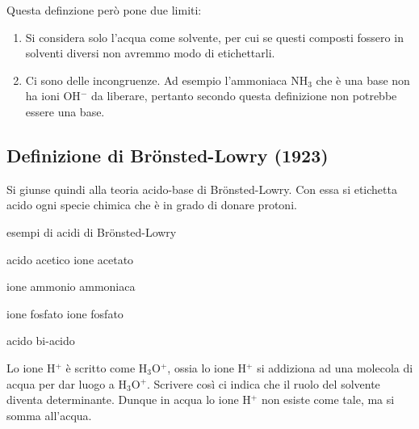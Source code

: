 \vspace{0.2cm}

\vspace{0.2cm}

\vspace{0.2cm}Questa definzione però pone due limiti:

\begin{enumerate}
    \item Si considera solo l'acqua come solvente, per cui se questi composti fossero in solventi diversi non avremmo modo di etichettarli.
    \item Ci sono delle incongruenze. Ad esempio l'ammoniaca NH$_3$ che è una base non ha ioni OH$^-$ da liberare, pertanto secondo questa definizione non potrebbe essere una base.
\end{enumerate}
\subsection{Definizione di Brönsted-Lowry (1923)}
Si giunse quindi alla teoria acido-base di Brönsted-Lowry. Con essa si etichetta acido ogni specie chimica che è in grado di donare protoni.

\vspace{0.2cm}esempi di acidi di Brönsted-Lowry

\vspace{0.2cm}

acido acetico \hspace{2.55cm} ione acetato 

\vspace{0.2cm}

ione ammonio \hspace{1.35cm} ammoniaca

\vspace{0.2cm}

ione fosfato \hspace{2.25cm} ione fosfato

acido \hspace{3.4cm} bi-acido

\vspace{0.2cm}Lo ione H$^+$ è scritto come H$_3$O$^+$, ossia lo ione H$^+$ si addiziona ad una molecola di acqua per dar luogo a H$_3$O$^+$. Scrivere così ci indica che il ruolo del solvente diventa determinante. Dunque in acqua lo ione H$^+$ non esiste come tale, ma si somma all'acqua.

